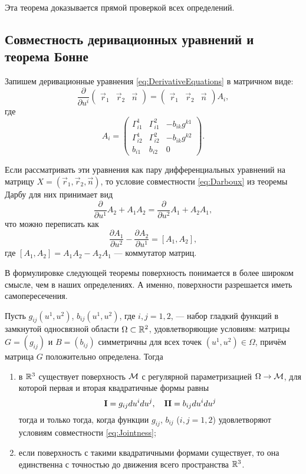 \noindent
Эта теорема доказывается прямой проверкой всех определений.

\subsection{Совместность деривационных уравнений и теорема Бонне}

Запишем деривационные уравнения \eqref{eq:DerivativeEquations} в матричном виде:
\[
	\frac{\partial}{\partial u^i}
	\begin{pmatrix}
		\vec{r}_1 & \vec{r}_2 & \vec{n}
	\end{pmatrix} =
	\begin{pmatrix}
		\vec{r}_1 & \vec{r}_2 & \vec{n}
	\end{pmatrix}A_i,
\]
где
\[
	A_i =
	\begin{pmatrix}
		\Gamma_{i1}^1 & \Gamma_{i1}^2 & -b_{ik}g^{k1}\\
		\Gamma_{i2}^1 & \Gamma_{i2}^2 & -b_{ik}g^{k2}\\
		b_{i1} & b_{i2} & 0
	\end{pmatrix}.
\]

Если рассматривать эти уравнения как пару дифференциальных уравнений на матрицу $X = (\vec{r}_1, \vec{r}_2, \vec{n})$, то условие совместности \eqref{eq:Darboux} из теоремы Дарбу для них принимает вид
\[
	\frac{\partial}{\partial u^1}A_2 + A_1A_2 = \frac{\partial}{\partial u^2}A_1 + A_2A_1,
\]
что можно переписать как
\begin{equation} \label{eq:Jointness}
	\frac{\partial A_1}{\partial u^2} - \frac{\partial A_2}{\partial u^1} = [A_1, A_2],
\end{equation}
где $[A_1, A_2] = A_1A_2 - A_2A_1$ --- коммутатор матриц.

В формулировке следующей теоремы поверхность понимается в более широком смысле, чем в наших определениях. А именно, поверхности разрешается иметь самопересечения.

\begin{theorem}[Бонне]
	Пусть $g_{ij}(u^1, u^2)$, $b_{ij}(u^1, u^2)$, где $i, j = 1, 2$, --- набор гладкий функций в замкнутой односвязной области $\Omega \subset \mathbb{R}^2$, удовлетворяющие условиям: матрицы $G = (g_{ij})$ и $B = (b_{ij})$ симметричны для всех точек $(u^1, u^2) \in \Omega$, причём матрица $G$ положительно определена. Тогда
	\begin{enumerate}[nolistsep, label=(\arabic*)]
		\item в $\mathbb{R}^3$ существует поверхность $\mathcal{M}$ с регулярной параметризацией $\Omega \to \mathcal{M}$, для которой первая и вторая квадратичные формы равны
			\[
				\boldsymbol{\operatorname{I}} = g_{ij}du^idu^j,\quad\boldsymbol{\operatorname{II}} = b_{ij}du^idu^j
			\]
			тогда и только тогда, когда функции $g_{ij}$, $b_{ij}$ ($i, j = 1, 2$) удовлетворяют условиям совместности \eqref{eq:Jointness};
		\item если поверхность с такими квадратичными формами существует, то она единственна с точностью до движения всего пространства $\mathbb{R}^3$.
	\end{enumerate}
\end{theorem}

